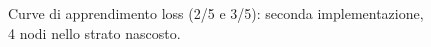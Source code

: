 \documentclass[a4paper,12pt]{article}
\begin{document}
\begin{figure}[htp]
    \centering

    \medskip


    \caption{Curve di apprendimento loss (2/5 e 3/5): seconda implementazione, 4 nodi nello strato nascosto.}
    \label{fig6-5}
\end{figure}
\end{document}
